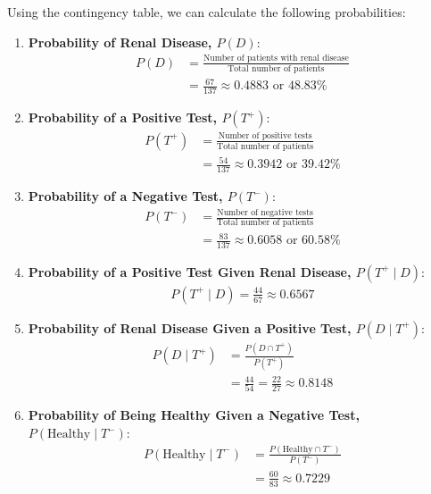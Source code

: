 \begin{solution}
    Using the contingency table, we can calculate the following probabilities:

    \begin{enumerate}[label=(\alph*)]
        \item \textbf{Probability of Renal Disease, \( P(D) \)}:
        \begin{align*}
        P(D) &= \frac{\text{Number of patients with renal disease}}{\text{Total number of patients}} \\
        &= \frac{67}{137} \approx 0.4883 \text{ or } 48.83\%
        \end{align*}
        
        \item \textbf{Probability of a Positive Test, \( P(T^+) \)}:
        \begin{align*}
        P(T^+) &= \frac{\text{Number of positive tests}}{\text{Total number of patients}} \\
        &= \frac{54}{137} \approx 0.3942 \text{ or } 39.42\%
        \end{align*}
        
        \item \textbf{Probability of a Negative Test, \( P(T^-) \)}:
        \begin{align*}
        P(T^-) &= \frac{\text{Number of negative tests}}{\text{Total number of patients}} \\
        &= \frac{83}{137} \approx 0.6058 \text{ or } 60.58\%
        \end{align*}


        \item \textbf{Probability of a Positive Test Given Renal Disease, \( P(T^+ \mid D) \)}:
        \begin{align*}
            P(T^+ \mid D)=\frac{44}{67} \approx 0.6567
        \end{align*}

        \item \textbf{Probability of Renal Disease Given a Positive Test, \( P(D \mid T^+) \)}:
        \begin{align*}
        P(D \mid T^+) &= \frac{P(D \cap T^+)}{P(T^+)} \\
        &= \frac{44}{54}=\frac{22}{27} \approx 0.8148
        \end{align*}

        \item \textbf{Probability of Being Healthy Given a Negative Test, \( P(\text{Healthy} \mid T^-) \)}:
        \begin{align*}
        P(\text{Healthy} \mid T^-) &= \frac{P(\text{Healthy} \cap T^-)}{P(T^-)} \\
        &= \frac{60}{83} \approx 0.7229
        \end{align*}


\end{enumerate}
\end{solution}
